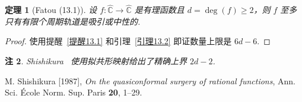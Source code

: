 \documentclass[11pt, a4paper, oneside]{ctexart}
\newtheorem{theorem}{定理}[section]
\newtheorem{remark}[theorem]{注}
\newcommand{\C}{\mathbb{C}}
\begin{document}
    \begin{theorem}[Fatou (13.1)]
        设 $f:\hat{\C}\to\hat{\C}$ 是有理函数且 $d=\deg(f)\geq 2$，则 $f$ 至多只有有限个周期轨道是吸引或中性的.
    \end{theorem}
    \begin{proof}
        使用提醒~\ref{提醒13.1} 和引理~\ref{引理13.2} 即证数量上限是 $6d-6$.
    \end{proof}
    \begin{remark}
        Shishikura~\cite{Shishikura} 使用拟共形映射给出了精确上界 $2d-2$.
    \end{remark}
    
    \begin{thebibliography}{}
        M. Shishikura [1987], \emph{On the quasiconformal surgery of rational functions}, Ann. Sci. École Norm. Sup. Paris \textbf{20}, 1--29.
    \end{thebibliography}
\end{document}
